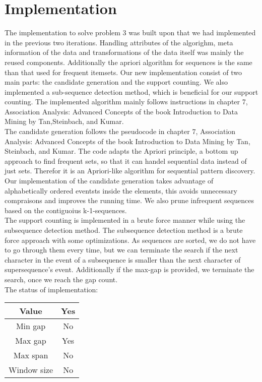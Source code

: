 \section{Implementation}
The implementation to solve problem 3 was built upon that we had implemented in the previous two iterations. Handling attributes of the algorighm, meta information of the data and transformations of the data itself was mainly the reused components. Additionally the apriori algorithm for sequences is the same than that used for frequent itemsets. Our new implementation consist of two main parts: the candidate generation and the support counting. We also implemented a sub-sequence detection method, which is beneficial for our support counting. The implemented algorithm mainly follows instructions in chapter 7, Association Analysis: Advanced Concepts of the book Introduction to Data Mining by Tan,Steinbach, and Kumar.\\ 

The candidate generation follows the pseudocode in chapter 7, Association Analysis: Advanced Concepts of the book Introduction to Data Mining by Tan, Steinbach, and Kumar. The code adapts the Apriori principle, a bottom up approach to find frequent sets, so that it  can handel sequential data instead of just sets. Therefor it is an Apriori-like algorithm for sequential pattern discovery.\\
Our implementation of the candidate generation takes advantage of alphabetically ordered eventsts inside the elements, this avoids unnecessary compraisons and  improves the running time. We also prune infrequent sequences based on the contiguoius {k-1}-sequences.\\

The support counting is implemented in a brute force manner while using the subsequence detection method. The subsequence detection method is a brute force approach with some optimizations. As sequences are sorted, we do not have to go through them every time, but we can terminate the search if the next character in the event of a subsequence is smaller than the next character of supersequence’s event. Additionally if the max-gap is provided, we terminate the search, once we reach the gap count.\\

The status of implementation:\\
\begin{center}
\begin{tabular}{|c|c|}
\hline Value&Yes\\
\hline Min gap&No\\
\hline Max gap&Yes\\
\hline Max span&No\\
\hline Window size&No\\
\hline
\end{tabular}
\end{center}

